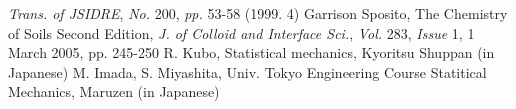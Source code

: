 \documentclass{article}
\begin{document}
\begin{thebibliography}{99}
   \textit{Trans. of JSIDRE}, \textit{No.} 200, \textit{pp.} 53-58 (1999. 4)
  Garrison Sposito, The Chemistry of Soils Second Edition, 
  \textit{J. of Colloid and Interface Sci.}, \textit{Vol.} 283, \textit{Issue} 1, 1 March 2005, pp. 245-250
     R. Kubo, Statistical mechanics, Kyoritsu Shuppan (in Japanese)
  M. Imada, S. Miyashita, Univ. Tokyo Engineering Course Statitical Mechanics, Maruzen (in Japanese)
\end{thebibliography}
\end{document}
